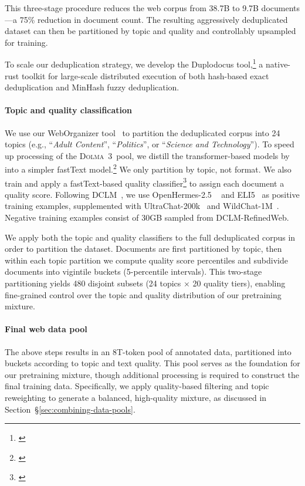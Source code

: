 \documentclass[table]{ai2style/ai2}
\newcommand{\dolmatoo}{\textsc{Dolma~3}\xspace}
\begin{document}
This three-stage procedure reduces the web corpus from 38.7B to 9.7B documents—a 75\% reduction in document count. The resulting aggressively deduplicated dataset can then be partitioned by topic and quality and controllably upsampled for training.

To scale our deduplication strategy, we develop the Duplodocus tool,\footnote{\href{https://github.com/allenai/duplodocus}{}} a native-rust toolkit for large-scale distributed execution of both hash-based exact deduplication and MinHash fuzzy deduplication.

\paragraph{Topic and quality classification}

We use our WebOrganizer tool~\citep{weborganizer} to partition the deduplicated corpus into 24 topics (e.g., ``\textit{Adult Content}'', ``\textit{Politics}'', or ``\textit{Science and Technology}''). 
To speed up processing of the \dolmatoo~pool, we distill the transformer-based models by \citealt{weborganizer} into a simpler fastText model.\footnote{\href{https://huggingface.co/allenai/dolma3-fasttext-weborganizer-topic-classifier}{}}
We only partition by topic, not format.
We also train and apply a fastText-based quality classifier\footnote{\href{https://huggingface.co/allenai/dolma3-fasttext-quality-classifier}{}} to assign each document a quality score. Following DCLM~\citep{dclm}, we use OpenHermes-2.5 ~\citep{OpenHermes} and ELI5~\citep{fan2019eli5} as positive training examples, supplemented with UltraChat-200k~\citep{ding2023enhancing} and WildChat-1M~\citep{zhao2024wildchat}. Negative training examples consist of 30GB sampled from DCLM-RefinedWeb.

We apply both the topic and quality classifiers to the full deduplicated corpus in order to partition the dataset. Documents are first partitioned by topic, then within each topic partition we compute quality score percentiles and subdivide documents into vigintile buckets (5-percentile intervals). This two-stage partitioning yields 480 disjoint subsets (24 topics $\times$ 20 quality tiers), enabling fine-grained control over the topic and quality distribution of our pretraining mixture.

\paragraph{Final web data pool} The above steps results in an 8T-token pool of annotated data, partitioned into buckets according to topic and text quality. This pool serves as the foundation for our pretraining mixture, though additional processing is required to construct the final training data. Specifically, we apply quality-based filtering and topic reweighting to generate a balanced, high-quality mixture, as discussed in Section~\S\ref{sec:combining-data-pools}.
\end{document}
